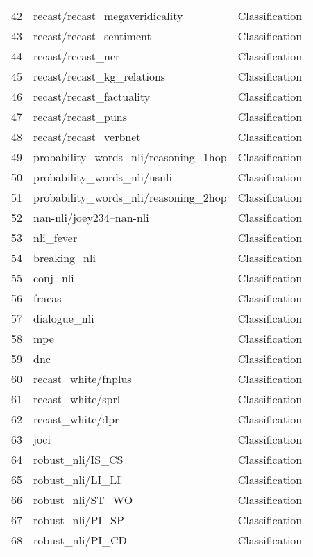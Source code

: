 \documentclass[11pt]{article}
\begin{document}
\begin{longtable}{lll}
42 & recast/recast\_megaveridicality \citep{poliak-etal-2018-collecting} & Classification \\
43 & recast/recast\_sentiment \citep{poliak-etal-2018-collecting} & Classification \\
44 & recast/recast\_ner \citep{poliak-etal-2018-collecting} & Classification \\
45 & recast/recast\_kg\_relations \citep{poliak-etal-2018-collecting} & Classification \\
46 & recast/recast\_factuality \citep{poliak-etal-2018-collecting} & Classification \\
47 & recast/recast\_puns \citep{poliak-etal-2018-collecting} & Classification \\
48 & recast/recast\_verbnet \citep{poliak-etal-2018-collecting} & Classification \\
49 & probability\_words\_nli/reasoning\_1hop \citep{sileo2022probing} & Classification \\
50 & probability\_words\_nli/usnli \citep{sileo2022probing} & Classification \\
51 & probability\_words\_nli/reasoning\_2hop \citep{sileo2022probing} & Classification \\
52 & nan-nli/joey234--nan-nli & Classification \\
53 & nli\_fever & Classification \\
54 & breaking\_nli & Classification \\
55 & conj\_nli & Classification \\
56 & fracas & Classification \\
57 & dialogue\_nli & Classification \\
58 & mpe & Classification \\
59 & dnc & Classification \\
60 & recast\_white/fnplus & Classification \\
61 & recast\_white/sprl & Classification \\
62 & recast\_white/dpr & Classification \\
63 & joci & Classification \\
64 & robust\_nli/IS\_CS & Classification \\
65 & robust\_nli/LI\_LI & Classification \\
66 & robust\_nli/ST\_WO & Classification \\
67 & robust\_nli/PI\_SP & Classification \\
68 & robust\_nli/PI\_CD & Classification \\

\end{longtable}
\end{document}
